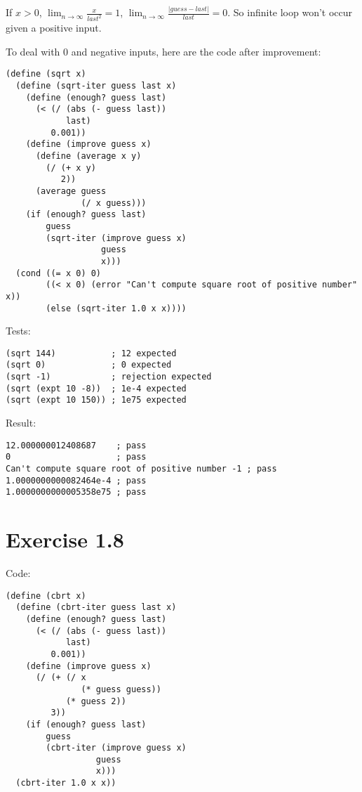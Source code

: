 \documentclass[../main.tex]{subfiles}
\begin{document}
If $x > 0$, $\lim_{n \to \infty}\frac{x}{last^2} = 1$, 
 $\lim_{n \to \infty}\frac{|guess-last|}{last} = 0$. So
 infinite loop won't occur given a positive input.

To deal with 0 and negative inputs, here are the code after
 improvement:

\begin{lstlisting}
(define (sqrt x)
  (define (sqrt-iter guess last x)
    (define (enough? guess last)
      (< (/ (abs (- guess last))
            last)
         0.001))
    (define (improve guess x)
      (define (average x y)
        (/ (+ x y)
           2))
      (average guess
               (/ x guess)))
    (if (enough? guess last)
        guess
        (sqrt-iter (improve guess x)
                   guess
                   x)))
  (cond ((= x 0) 0)
        ((< x 0) (error "Can't compute square root of positive number" x))
        (else (sqrt-iter 1.0 x x))))
\end{lstlisting}

Tests:

\begin{lstlisting}
(sqrt 144)           ; 12 expected
(sqrt 0)             ; 0 expected
(sqrt -1)            ; rejection expected
(sqrt (expt 10 -8))  ; 1e-4 expected
(sqrt (expt 10 150)) ; 1e75 expected
\end{lstlisting}

Result:

\begin{lstlisting}
12.000000012408687    ; pass
0                     ; pass
Can't compute square root of positive number -1 ; pass
1.0000000000082464e-4 ; pass
1.0000000000005358e75 ; pass
\end{lstlisting}

\section{Exercise 1.8}

Code:

\begin{lstlisting}
(define (cbrt x)
  (define (cbrt-iter guess last x)
    (define (enough? guess last)
      (< (/ (abs (- guess last))
            last)
         0.001))
    (define (improve guess x)
      (/ (+ (/ x
               (* guess guess))
            (* guess 2))
         3))
    (if (enough? guess last)
        guess
        (cbrt-iter (improve guess x)
                  guess
                  x)))
  (cbrt-iter 1.0 x x))
\end{lstlisting}
\end{document}
